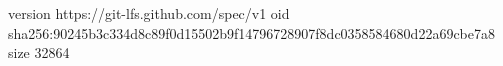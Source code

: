 version https://git-lfs.github.com/spec/v1
oid sha256:90245b3c334d8c89f0d15502b9f14796728907f8dc0358584680d22a69cbe7a8
size 32864
